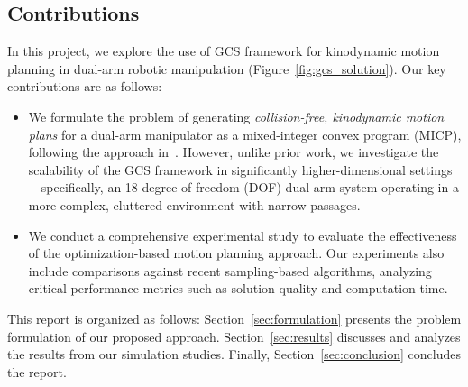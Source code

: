 \subsection{Contributions}
In this project, we explore the use of GCS framework for kinodynamic motion planning in dual-arm robotic manipulation (Figure~\ref{fig:gcs_solution}). Our key contributions are as follows:

\begin{itemize}
\item We formulate the problem of generating \textit{collision-free, kinodynamic motion plans} for a dual-arm manipulator as a mixed-integer convex program (MICP), following the approach in~\cite{marcucci2023motion}. However, unlike prior work, we investigate the scalability of the GCS framework in significantly higher-dimensional settings---specifically, an 18-degree-of-freedom (DOF) dual-arm system operating in a more complex, cluttered environment with narrow passages.
 
\item We conduct a comprehensive experimental study to evaluate the effectiveness of the optimization-based motion planning approach. Our experiments also include comparisons against recent sampling-based algorithms, analyzing critical performance metrics such as solution quality and computation time.
\end{itemize} 

This report is organized as follows: Section~\ref{sec:formulation} presents the problem formulation of our proposed approach. Section~\ref{sec:results} discusses and analyzes the results from our simulation studies. Finally, Section~\ref{sec:conclusion} concludes the report.